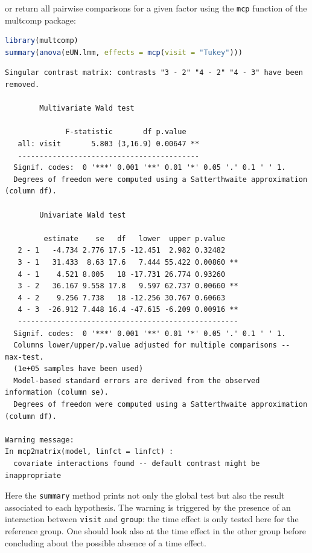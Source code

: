 \documentclass[12pt]{article}
\begin{document}
\clearpage

or return all pairwise comparisons for a given factor using the \texttt{mcp}
function of the multcomp package:
\begin{lstlisting}[language=r,numbers=none]
library(multcomp)
summary(anova(eUN.lmm, effects = mcp(visit = "Tukey")))
\end{lstlisting}

\label{}
\begin{verbatim}
Singular contrast matrix: contrasts "3 - 2" "4 - 2" "4 - 3" have been removed. 

		Multivariate Wald test 

              F-statistic       df p.value   
   all: visit       5.803 (3,16.9) 0.00647 **
   ------------------------------------------ 
  Signif. codes:  0 '***' 0.001 '**' 0.01 '*' 0.05 '.' 0.1 ' ' 1.
  Degrees of freedom were computed using a Satterthwaite approximation (column df). 

		Univariate Wald test 

         estimate    se   df   lower  upper p.value   
   2 - 1   -4.734 2.776 17.5 -12.451  2.982 0.32482   
   3 - 1   31.433  8.63 17.6   7.444 55.422 0.00860 **
   4 - 1    4.521 8.005   18 -17.731 26.774 0.93260   
   3 - 2   36.167 9.558 17.8   9.597 62.737 0.00660 **
   4 - 2    9.256 7.738   18 -12.256 30.767 0.60663   
   4 - 3  -26.912 7.448 16.4 -47.615 -6.209 0.00916 **
   --------------------------------------------------- 
  Signif. codes:  0 '***' 0.001 '**' 0.01 '*' 0.05 '.' 0.1 ' ' 1.
  Columns lower/upper/p.value adjusted for multiple comparisons -- max-test.
  (1e+05 samples have been used)
  Model-based standard errors are derived from the observed information (column se). 
  Degrees of freedom were computed using a Satterthwaite approximation (column df). 

Warning message:
In mcp2matrix(model, linfct = linfct) :
  covariate interactions found -- default contrast might be inappropriate
\end{verbatim}

Here the \texttt{summary} method prints not only the global test but also the
result associated to each hypothesis. The warning is triggered by the
presence of an interaction between \texttt{visit} and \texttt{group}: the time
effect is only tested here for the reference group. One should look
also at the time effect in the other group before concluding about the
possible absence of a time effect.

\bigskip
\end{document}
